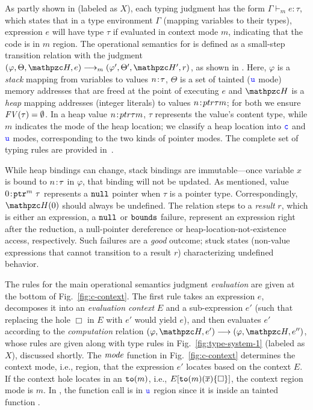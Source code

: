 As partly shown in  (labeled as $X$),
each typing judgment has the form $\Gamma\vdash_m e : \tau$,
which states that in a type environment $\Gamma$ (mapping variables to
their types), expression $e$ will have type $\tau$ if evaluated
in context mode $m$, indicating that the code is in $m$ region.
The operational semantics for \lang is defined as a small-step
transition relation with the judgment $ (\varphi,\Theta,\heap,e)
\longrightarrow_m (\varphi',\Theta',\heap',r)$, as shown in .
 Here, $\varphi$ is a
\emph{stack} mapping from variables to values ${n}\!:\!{\tau}$,
$\Theta$ is a set of tainted ($\textcolor{blue}{\texttt{u}}$ mode) memory addresses that are freed at the point of executing $e$
and $\heap$ is a \emph{heap} mapping addresses (integer literals) to
values ${n}\!:\!{ptr{\tau}{m}}$; for both we ensure
$\mathit{FV}(\tau)=\emptyset$.
In a heap value ${n}\!:\!{ptr{\tau}{m}}$,
$\tau$ represents the value's content type, while $m$ indicates the mode of the heap location;
we classify a heap location into $\textcolor{blue}{\texttt{c}}$ and $\textcolor{blue}{\texttt{u}}$ modes, corresponding to the two kinds of pointer modes.
The complete set of typing rules are provided in~.

While heap bindings can change, stack bindings are immutable---once
variable $x$ is bound to ${n}\!:\!{\tau}$ in $\varphi$, that binding will not
be updated. 
As mentioned, value ${0}\!:\!{\mathtt{ptr}^{m}~{\tau}}$
represents a $\mathtt{null}$ pointer when $\tau$ is a pointer type.
Correspondingly, $\heap(0)$ should always be undefined.
% 
The relation steps to a \emph{result} $r$, which is either an
expression, a $\mathtt{null}$ or $\mathtt{bounds}$ failure, represent an expression right
  after the reduction, a null-pointer dereference or heap-location-not-existence access,
respectively.
% 
Such failures are a \emph{good} outcome; stuck states
(non-value expressions that cannot transition to a result $r$)
characterizing undefined behavior.

The rules for the main operational semantics
judgment \emph{evaluation} are given at the bottom of
Fig.~\ref{fig:c-context}.
The first rule takes an expression $e$, decomposes
it into an \emph{evaluation context} $E$ and a sub-expression $e'$
(such that replacing the hole $\Box$ in $E$ with $e'$ would yield
$e$), and then evaluates $e'$ according to the \emph{computation}
  relation $(\varphi,\heap,e') \longrightarrow (\varphi,\heap,e'')$,
whose rules are given along with type rules in Fig.~\ref{fig:type-system-1} (labeled as $X$), discussed
shortly.
The $\textit{mode}$ function in Fig.~\ref{fig:c-context}
determines the context mode, i.e., region, that the expression $e'$ locates based on the context $E$.
If the context hole locates in an $\mathtt{to}(m)$, i.e., $E[\mathtt{to}({m})(\overline{x})\{\Box\}]$, the context region mode is $m$.
In , the function call  is in $\textcolor{blue}{\texttt{u}}$ region since it is inside an tainted function .

